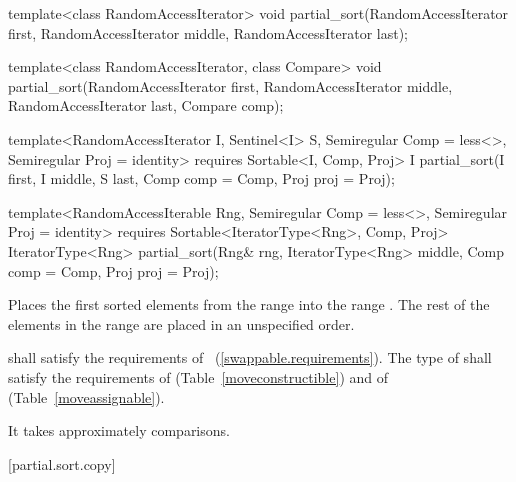 %
\begin{removedblock}
\begin{itemdecl}
template<class RandomAccessIterator>
  void partial_sort(RandomAccessIterator first,
                    RandomAccessIterator middle,
                    RandomAccessIterator last);

template<class RandomAccessIterator, class Compare>
  void partial_sort(RandomAccessIterator first,
                    RandomAccessIterator middle,
                    RandomAccessIterator last,
                    Compare comp);
\end{itemdecl}
\end{removedblock}
\begin{addedblock}
\begin{itemdecl}
template<RandomAccessIterator I, Sentinel<I> S, Semiregular Comp = less<>,
    Semiregular Proj = identity>
  requires Sortable<I, Comp, Proj>
  I partial_sort(I first, I middle, S last, Comp comp = Comp{}, Proj proj = Proj{});

template<RandomAccessIterable Rng, Semiregular Comp = less<>, Semiregular Proj = identity>
  requires Sortable<IteratorType<Rng>, Comp, Proj>
  IteratorType<Rng>
    partial_sort(Rng& rng, IteratorType<Rng> middle, Comp comp = Comp{},
                 Proj proj = Proj{});
\end{itemdecl}
\end{addedblock}

\begin{itemdescr}
\pnum
\effects
Places the first
sorted elements from the range
into the range
.
The rest of the elements in the range
are placed in an unspecified order.
%

\begin{removedblock}
\pnum
\requires
{} shall satisfy the requirements of
~(\ref{swappable.requirements}). The type
of  shall satisfy the requirements of
 (Table~\ref{moveconstructible}) and of
 (Table~\ref{moveassignable}).
\end{removedblock}

\pnum
\complexity
It takes approximately
comparisons.
\end{itemdescr}

[partial.sort.copy]{}

